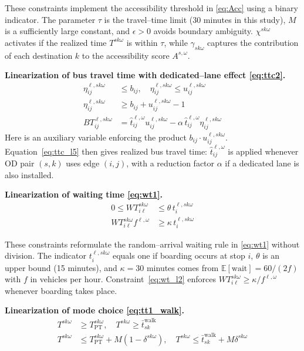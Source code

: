 \documentclass[3p,times,procedia]{elsarticle}
\begin{document}
These constraints implement the accessibility threshold in \eqref{eq:Acc} using a binary indicator.  
The parameter $\tau$ is the travel–time limit (30 minutes in this study), $M$ is a sufficiently large constant, and $\epsilon>0$ avoids boundary ambiguity.  
$\chi^{sk\omega}$ activates if the realized time $T^{sk\omega}$ is within $\tau$, while $\gamma_{sk\omega}$ captures the contribution of each destination $k$ to the accessibility score $A^{s,\omega}$.


\textbf{Linearization of bus travel time with dedicated–lane effect \eqref{eq:ttc2}.}
\begin{align}
\eta_{ij}^{\ell,sk\omega} &\le b_{ij},
\quad
\eta_{ij}^{\ell,sk\omega} \le u_{ij}^{\ell,sk\omega} \label{eq:ttc_l2}\\
\eta_{ij}^{\ell,sk\omega} &\ge b_{ij} + u_{ij}^{\ell,sk\omega} - 1 \label{eq:ttc_l4}\\
BT_{ij}^{\ell,sk\omega} &= \hat{t}_{ij}^{\ell,\omega} u_{ij}^{\ell,sk\omega}
- \alpha \,\hat{t}_{ij}^{\ell,\omega} \eta_{ij}^{\ell,sk\omega} \label{eq:ttc_l5}
\end{align}
Here  is an auxiliary variable enforcing the product $b_{ij} \cdot u_{ij}^{\ell,sk\omega}$.
Equation~\eqref{eq:ttc_l5} then gives realized bus travel time: $\hat{t}_{ij}^{\ell,\omega}$ is applied whenever OD pair $(s,k)$ uses edge $(i,j)$, with a reduction factor $\alpha$ if a dedicated lane is also installed.


\textbf{Linearization of waiting time \eqref{eq:wt1}.}
\begin{align}
0 \le WT_{i\ell}^{sk\omega} &\le \theta \, t_{i}^{\ell,sk\omega} \label{eq:wt_l1}\\
WT_{i\ell}^{sk\omega} f^{\ell,\omega} &\ge \kappa \, t_{i}^{\ell,sk\omega} \label{eq:wt_l2}
\end{align}

These constraints reformulate the random–arrival waiting rule in \eqref{eq:wt1} without division.  
The indicator $t_{i}^{\ell,sk\omega}$ equals one if boarding occurs at stop $i$, $\theta$ is an upper bound (15 minutes), and $\kappa=30$ minutes comes from $\mathbb{E}[\text{wait}]=60/(2f)$ with $f$ in vehicles per hour.  
Constraint~\eqref{eq:wt_l2} enforces $WT_{i\ell}^{sk\omega} \ge \kappa/f^{\ell,\omega}$ whenever boarding takes place.


\textbf{Linearization of mode choice \eqref{eq:tt1_walk}.}
\begin{align}
T^{sk\omega} &\ge T_{\text{PT}}^{sk\omega},
\quad
T^{sk\omega} \ge \bar{t}_{sk}^{\text{walk}} \label{eq:tt_l2}\\
T^{sk\omega} &\le T_{\text{PT}}^{sk\omega} + M (1 - \delta^{sk\omega}),
\quad
T^{sk\omega} \le \bar{t}_{sk}^{\text{walk}} + M \delta^{sk\omega} \label{eq:tt_l4}
\end{align}
\end{document}
